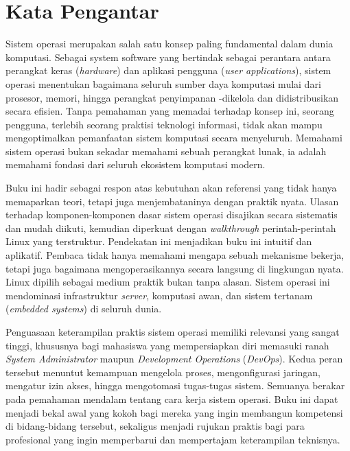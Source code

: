 
\chapter*{Kata Pengantar}

\noindent
Sistem operasi merupakan salah satu konsep paling fundamental dalam dunia komputasi. Sebagai system software yang bertindak sebagai perantara antara perangkat keras (\textit{hardware}) dan aplikasi pengguna (\textit{user applications}), sistem operasi menentukan bagaimana seluruh sumber daya komputasi mulai dari prosesor, memori, hingga perangkat penyimpanan -dikelola dan didistribusikan secara efisien. Tanpa pemahaman yang memadai terhadap konsep ini, seorang pengguna, terlebih seorang praktisi teknologi informasi, tidak akan mampu mengoptimalkan pemanfaatan sistem komputasi secara menyeluruh. Memahami sistem operasi bukan sekadar memahami sebuah perangkat lunak, ia adalah memahami fondasi dari seluruh ekosistem komputasi modern.

\vspace{1cm}

\noindent
Buku ini hadir sebagai respon atas kebutuhan akan referensi yang tidak hanya memaparkan teori, tetapi juga menjembataninya dengan praktik nyata. Ulasan terhadap komponen-komponen dasar sistem operasi disajikan secara sistematis dan mudah diikuti, kemudian diperkuat dengan \textit{walkthrough} perintah-perintah Linux yang terstruktur. Pendekatan ini menjadikan buku ini intuitif dan aplikatif. Pembaca tidak hanya memahami mengapa sebuah mekanisme bekerja, tetapi juga bagaimana mengoperasikannya secara langsung di lingkungan nyata. Linux dipilih sebagai medium praktik bukan tanpa alasan. Sistem operasi ini mendominasi infrastruktur \textit{server}, komputasi awan, dan sistem tertanam (\textit{embedded systems}) di seluruh dunia.

\vspace{1cm}

\noindent
Penguasaan keterampilan praktis sistem operasi memiliki relevansi yang sangat tinggi, khususnya bagi mahasiswa yang mempersiapkan diri memasuki ranah \textit{System Administrator} maupun \textit{Development Operations} (\textit{DevOps}). Kedua peran tersebut menuntut kemampuan mengelola proses, mengonfigurasi jaringan, mengatur izin akses, hingga mengotomasi tugas-tugas sistem. Semuanya berakar pada pemahaman mendalam tentang cara kerja sistem operasi. Buku ini dapat menjadi bekal awal yang kokoh bagi mereka yang ingin membangun kompetensi di bidang-bidang tersebut, sekaligus menjadi rujukan praktis bagi para profesional yang ingin memperbarui dan mempertajam keterampilan teknisnya.

